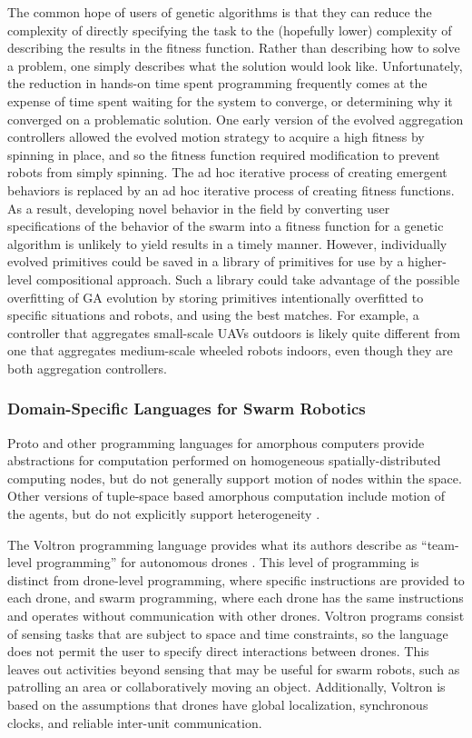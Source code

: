 \documentclass[]{article}
\begin{document}
The common hope of users of genetic algorithms is that they can reduce the complexity of directly specifying the task to the (hopefully lower) complexity of describing the results in the fitness function.
Rather than describing how to solve a problem, one simply describes what the solution would look like. 
Unfortunately, the reduction in hands-on time spent programming frequently comes at the expense of time spent waiting for the system to converge, or determining why it converged on a problematic solution. 
One early version of the evolved aggregation controllers allowed the evolved motion strategy to acquire a high fitness by spinning in place, and so the fitness function required modification to prevent robots from simply spinning. 
The ad hoc iterative process of creating emergent behaviors is replaced by an ad hoc iterative process of creating fitness functions.
As a result, developing novel behavior in the field by converting user specifications of the behavior of the swarm into a fitness function for a genetic algorithm is unlikely to yield results in a timely manner. 
However, individually evolved primitives could be saved in a library of primitives for use by a higher-level compositional approach. 
Such a library could take advantage of the possible overfitting of GA evolution by storing primitives intentionally overfitted to specific situations and robots, and using the best matches. 
For example, a controller that aggregates small-scale UAVs outdoors is likely quite different from one that aggregates medium-scale wheeled robots indoors, even though they are both aggregation controllers. 

\subsubsection{Domain-Specific Languages for Swarm Robotics}

Proto and other programming languages for amorphous computers provide abstractions for computation performed on homogeneous spatially-distributed computing nodes, but do not generally support motion of nodes within the space. 
Other versions of tuple-space based amorphous computation include motion of the agents, but do not explicitly support heterogeneity \cite{viroli2012linda}.

The Voltron programming language provides what its authors describe as ``team-level programming'' for autonomous drones \cite{mottola2014team}.
This level of programming is distinct from drone-level programming, where specific instructions are provided to each drone, and swarm programming, where each drone has the same instructions and operates without communication with other drones.
Voltron programs consist of sensing tasks that are subject to space and time constraints, so the language does not permit the user to specify direct interactions between drones. 
This leaves out activities beyond sensing that may be useful for swarm robots, such as patrolling an area or collaboratively moving an object.
Additionally, Voltron is based on the assumptions that drones have global localization, synchronous clocks, and reliable inter-unit communication.   
\end{document}
